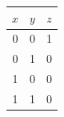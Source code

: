 \begin{tabular}{ccc}\toprule
\(x\)&\(y\)&\(z\)\\\midrule
0&0&1\\
0&1&0\\
1&0&0\\
1&1&0\\
\bottomrule\end{tabular}
